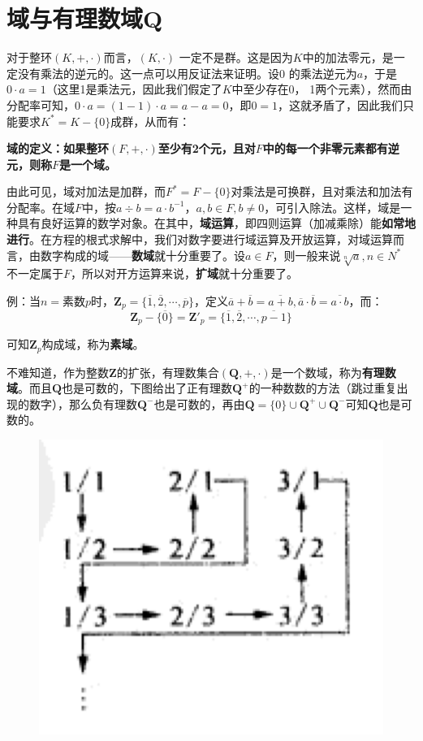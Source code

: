 \documentclass[12pt]{article}
\begin{document}
\section{域与有理数域Q}
对于整环$(K, +, \cdot)$而言，$(K, \cdot)$ 一定不是群。这是因为$K$中的加法零元，是一定没有乘法的逆元的。这一点可以用反证法来证明。设0 的乘法逆元为$a$，于是$0 \cdot a = 1$（这里1是乘法元，因此我们假定了$K$中至少存在0， 1两个元素），然而由分配率可知，$0 \cdot a  = (1 - 1)\cdot a = a - a = 0$，即$0 = 1$，这就矛盾了，因此我们只能要求$K^* = K - \{0\}$成群，从而有：
\begin{mdframed}[
linecolor=black!40,outerlinewidth=1pt,roundcorner=.5em,innertopmargin=1ex,innerbottommargin=.5\baselineskip,innerrightmargin=1em,innerleftmargin=1em,backgroundcolor=gray!5,
]
\textbf{
域的定义：如果整环$(F, +, \cdot)$至少有2个元，且对$F$中的每一个非零元素都有逆元，则称$F$是一个域。
}
\end{mdframed}

由此可见，域对加法是加群，而$F^* = F - \{0\}$对乘法是可换群，且对乘法和加法有分配率。在域$F$中，按$a\div b = a \cdot b^{-1}， a,b \in F, b \neq 0$，可引入除法。这样，域是一种具有良好运算的数学对象。在其中，\textbf{域运算}，即四则运算（加减乘除）能\textbf{如常地进行}。在方程的根式求解中，我们对数字要进行域运算及开放运算，对域运算而言，由数字构成的域——\textbf{数域}就十分重要了。设$a \in F$，则一般来说$\sqrt[n]{a}, n \in N^*$ 不一定属于$F$，所以对开方运算来说，\textbf{扩域}就十分重要了。

\begin{framed}
例：当$n =$素数$p$时，$\mathbf{Z}_p = \{\overline{1}, \overline{2}, \cdots, \overline{p}\}$，定义$\overline{a} + \overline{b} = \overline{a + b}, \overline{a} \cdot \overline{b} = \overline{a \cdot b}$，而：
$$
\mathbf{Z}_p - \{\overline{0}\} = \mathbf{Z}'_p = \{\overline{1}, \overline{2}, \cdots, \overline{p-1}\}
$$

可知$\mathbf{Z}_p$构成域，称为\textbf{素域}。
\end{framed}

不难知道，作为整数$\mathbf{Z}$的扩张，有理数集合$(\mathbf{Q}, +, \cdot)$是一个数域，称为\textbf{有理数域}。而且$\mathbf{Q}$也是可数的，下图给出了正有理数$\mathbf{Q}^+$的一种数数的方法（跳过重复出现的数字），那么负有理数$\mathbf{Q}^-$也是可数的，再由$\mathbf{Q} = \{0\} \cup \mathbf{Q}^+ \cup \mathbf{Q}^- $可知$\mathbf{Q} $也是可数的。
\begin{figure}[H]
    \centering
    \includegraphics[width=.3\textwidth]{fig/GroupTheoryRationalComputational.png}
\end{figure}
\end{document}
